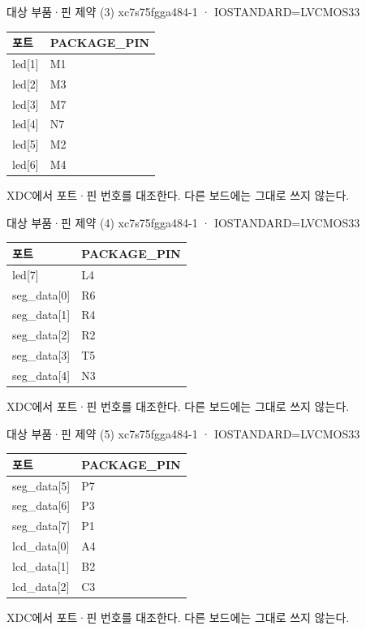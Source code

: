 \begin{frame}{대상 부품·핀 제약 (3)}\relax
\small
xc7s75fgga484-1 · IOSTANDARD=LVCMOS33\par\begin{center}\renewcommand{\arraystretch}{1.45}
\begin{tabular}{l|l}
포트 & PACKAGE\_PIN\\\hline
led[1] & M1\\
led[2] & M3\\
led[3] & M7\\
led[4] & N7\\
led[5] & M2\\
led[6] & M4\\
\end{tabular}\end{center}
XDC에서 포트·핀 번호를 대조한다. 다른 보드에는 그대로 쓰지 않는다.\par
\end{frame}

\begin{frame}{대상 부품·핀 제약 (4)}\relax
\small
xc7s75fgga484-1 · IOSTANDARD=LVCMOS33\par\begin{center}\renewcommand{\arraystretch}{1.45}
\begin{tabular}{l|l}
포트 & PACKAGE\_PIN\\\hline
led[7] & L4\\
seg\_data[0] & R6\\
seg\_data[1] & R4\\
seg\_data[2] & R2\\
seg\_data[3] & T5\\
seg\_data[4] & N3\\
\end{tabular}\end{center}
XDC에서 포트·핀 번호를 대조한다. 다른 보드에는 그대로 쓰지 않는다.\par
\end{frame}

\begin{frame}{대상 부품·핀 제약 (5)}\relax
\small
xc7s75fgga484-1 · IOSTANDARD=LVCMOS33\par\begin{center}\renewcommand{\arraystretch}{1.45}
\begin{tabular}{l|l}
포트 & PACKAGE\_PIN\\\hline
seg\_data[5] & P7\\
seg\_data[6] & P3\\
seg\_data[7] & P1\\
lcd\_data[0] & A4\\
lcd\_data[1] & B2\\
lcd\_data[2] & C3\\
\end{tabular}\end{center}
XDC에서 포트·핀 번호를 대조한다. 다른 보드에는 그대로 쓰지 않는다.\par
\end{frame}

